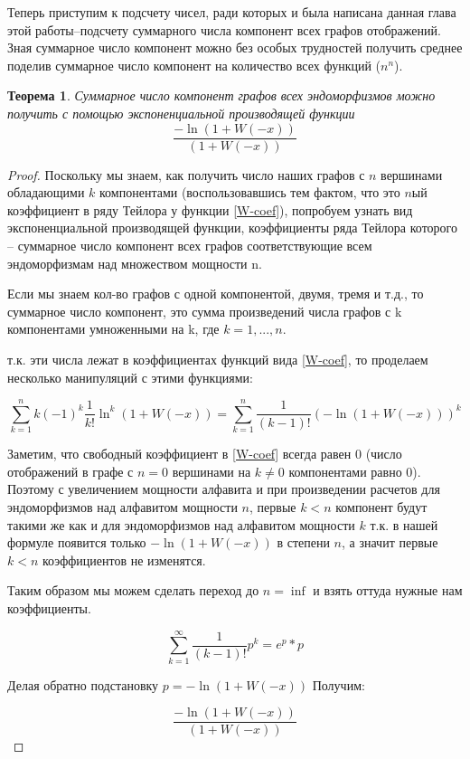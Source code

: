 \documentclass[10pt, a4paper]{report}
\newtheorem{theorem}{Теорема}[chapter]
\theoremstyle{definition}
\renewcommand{\log}{\ln}
\begin{document}
Теперь приступим к подсчету чисел, ради которых и была написана данная глава этой работы--подсчету суммарного числа компонент всех графов отображений. Зная суммарное число компонент можно без особых трудностей получить среднее поделив суммарное число компонент на количество всех функций ($n^n$).

\begin{theorem}
	Суммарное число компонент графов всех эндоморфизмов можно получить с помощью экспоненциальной производящей функции
	$$\frac{-\log(1+W(-x))}{(1+W(-x))}$$
\end{theorem}

\begin{proof}
Поскольку мы знаем, как получить число наших графов с $n$ вершинами обладающими $k$ компонентами (воспользовавшись тем фактом, что это $n$ый коэффициент в ряду Тейлора у функции \eqref{W-coef}), попробуем узнать вид экспоненциальной производящей функции, коэффициенты ряда Тейлора которого -- суммарное число компонент всех графов соответствующие всем эндоморфизмам над множеством мощности n.

Если мы знаем кол-во графов с одной компонентой, двумя, тремя и т.д., то суммарное число компонент, это сумма произведений числа графов с k компонентами умноженными на k, где $k=1,...,n$.

т.к. эти числа лежат в коэффициентах функций вида \eqref{W-coef}, то проделаем несколько манипуляций с этими функциями:

$$\sum_{k=1}^{n} k (-1)^k \frac 1 {k!} \ln^k(1+W(-x))= 
\sum_{k=1}^{n} \frac 1 {(k-1)!} (-\ln(1+W(-x)))^k
$$

Заметим, что свободный коэффициент в \eqref{W-coef} всегда равен 0 (число отображений в графе с $n=0$ вершинами на $k\ne0$ компонентами равно 0). Поэтому с увеличением мощности алфавита и при произведении расчетов для эндоморфизмов над алфавитом мощности $n$, первые $k<n$ компонент будут такими же как и для эндоморфизмов над алфавитом мощности $k$ т.к. в нашей формуле появится только $-\ln(1+W(-x))$ в степени $n$, а значит первые $k<n$ коэффициентов не изменятся.

Таким образом мы можем сделать переход до $n=\inf$ и взять оттуда нужные нам коэффициенты.  

$$
\sum_{k=1}^{\infty} \frac 1 {(k-1)!} p^k=
e^p*p
$$

Делая обратно подстановку $p=-\ln(1+W(-x))$ Получим:

$$
\frac {-\ln(1+W(-x))}{(1+W(-x))}
$$
\end{proof}
\end{document}
